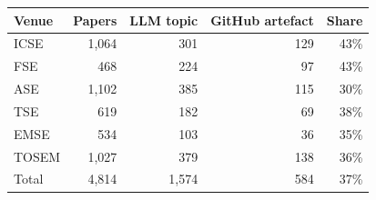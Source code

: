 \begin{tabular}{@{}l r r r r@{}}
\toprule
Venue & Papers & LLM topic & GitHub artefact & Share \\
\midrule
ICSE & 1{,}064 & 301 & 129 & 43\% \\
FSE & 468 & 224 & 97 & 43\% \\
ASE & 1{,}102 & 385 & 115 & 30\% \\
TSE & 619 & 182 & 69 & 38\% \\
EMSE & 534 & 103 & 36 & 35\% \\
TOSEM & 1{,}027 & 379 & 138 & 36\% \\
\midrule
Total & 4{,}814 & 1{,}574 & 584 & 37\% \\
\bottomrule
\end{tabular}
